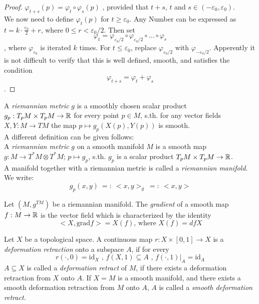 \begin{proof}
   $\varphi_{t+s}(p) = \varphi_t \circ \varphi_s (p)$ , provided that $t+s$, $t$
   and $s \in (-\varepsilon_0, \varepsilon_0)$. \\ 
   We now need to define $\varphi_t(p)$ for $t \geq \varepsilon_0$. Any Number 
   can be expressed as $t = k \cdot \frac{\varepsilon_0}{2} + r$, where 
   $0 \leq r < \varepsilon_0/2$. Then set 
   \[ \varphi_t = 
   \varphi_{\varepsilon_0/2} \circ \varphi_{\varepsilon_0/2} \circ ... \circ \varphi_r \]
   , where $\varphi_{\varepsilon_0}$ is iterated $k$ times. For 
   $t \leq \varepsilon_0$, replace $\varphi_{\varepsilon_0/2}$ with 
   $\varphi_{-\varepsilon_0/2}$. 
   Apperently it is not difficult to verify that this is well defined, smooth,
   and satisfies the condition \[\varphi_{t+s} = \varphi_t + \varphi_s\].
\end{proof}

\begin{definition}
   \label{def:riemannian metric}
   A \textit{riemannian metric} $g$ is a smoothly chosen scalar product 
   $g_p: T_pM \times T_pM \rightarrow {\mathbb R}$ for every point $p \in M$, s.th. for 
   any vector fields $ X, Y: M \rightarrow TM $ the map 
   $ p \mapsto g_p(X(p), Y(p)) $ is smooth. \\
   A different definition can be given follows: \\
   A \textit{riemannian metric} $g$ on a smooth manifold $M$ is a smooth map 
   $g: M \rightarrow T^*M \otimes T^*M$; $p \mapsto g_p$,
   s.th. $g_p$ is a scalar product $T_pM \times T_pM \rightarrow {\mathbb R}$. \\
   A manifold together with a riemannian metric is called a 
   \textit{riemannian manifold}. \\
   We write:
   \[ g_p(x,y) \: =: \: <x, y>_g \: =: \: <x, y> \]
\end{definition}

\begin{definition}[gradient]
   \label{def:gradient}
   Let $(M, g^{TM})$ be a riemannian manifold. The \textit{gradient} of a smooth 
   map $f: M \rightarrow {\mathbb R}$ is the vector field which is characterized by the 
   identity 
   \[ <X, \text{grad} f> = X(f) \text{, where } X(f) = dfX \]
\end{definition}

\begin{definition}
   \label{def:deformation retract}
   Let $X$ be a topological space. A continuous map $r: X \times [0, 1] \rightarrow X$ is 
   a \textit{deformation retraction} onto a subspace $A$, if for every 
   \[ r(\cdot,0) = \text{id}_X \text{ , } f(X, 1) \subseteq A \text{ , } f(\cdot, 1)|_A = \text{id}_A\]
   $A \subseteq X$ is called a \textit{deformation retract} of $M$, if there exists a
   deformation retraction from $X$ onto $A$.
   If $X = M$ is a smooth manifold, and there exists a smooth deformation
   retraction from $M$ onto $A$, $A$ is called a \textit{smooth deformation 
   retract}.
\end{definition}

